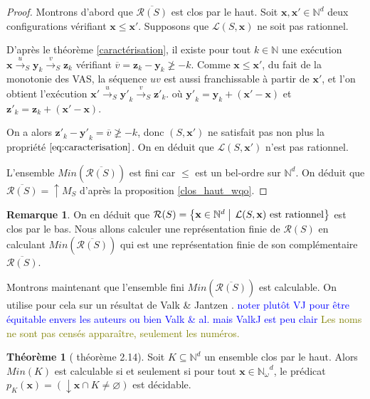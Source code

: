 \documentclass[a4paper,final]{article}
\theoremstyle{definition}
\newtheorem{Theorem}{Théorème}
\newtheorem*{Remark}{Remarque}
\let\leq\leqslant
\let\geq\geqslant
\newcommand{\alain}[1]{\textcolor{blue}{#1}}
\newcommand{\lucas}[1]{\textcolor{olive}{#1}}
\newcommand{\set}[2]{\left\{#1\mathrel{\left|\vphantom{#1}\vphantom{#2}\right.}#2\right\}}
\let\vide\varnothing
\newcommand{\Min}{\textit{Min}}
\newcommand{\N}{\ensuremath{\mathbb{N}}}
\newcommand{\Nomega}{\ensuremath{\mathbb{N}_\omega}}
\newcommand{\lang}{\ensuremath{\mathcal{L}}}
\newcommand{\trans}[2]{\ensuremath{\stackrel{#1}{\longrightarrow}_{#2}}}
\newcommand{\vect}[1]{\ensuremath{\mathbf{#1}}}
\newcommand{\valeur}[1]{\ensuremath{\overline{#1}}}
\newcommand{\inirat}{\mathcal{R}}
\begin{document}
\begin{proof}
Montrons d'abord que $\overline{\inirat(S)}$ est clos par le haut. Soit $\vect{x},\vect{x'}\in\N^d$ deux configurations vérifiant $\vect{x} \leq \vect{x'}$.
Supposons que $\lang(S,\vect{x})$ ne soit pas rationnel.

D'après le théorème \ref{caractérisation}, il existe pour tout $k\in\N$ une exécution $\vect{x} \trans{u}{S} \vect{y}_k \trans{v}{S} \vect{z}_k$ vérifiant $\valeur{v} = \vect{z}_k - \vect{y}_k \not\geq -k$.
Comme $\vect{x}\leq\vect{x'}$, du fait de la monotonie des VAS, la séquence $uv$ est aussi franchissable à partir de $\vect{x'}$, et l'on obtient l'exécution $\vect{x'} \trans{u}{S} \vect{y'}_k \trans{v}{S} \vect{z'}_k$.
où $\vect{y'}_k = \vect{y}_k + (\vect{x'} - \vect{x})$ et $\vect{z'}_k = \vect{z}_k + (\vect{x'} - \vect{x})$.

On a alors $\vect{z'}_k - \vect{y'}_k = \valeur{v} \not\geq -k$, donc $(S,\vect{x'})$ ne satisfait pas non plus la propriété $\eqref{eq:caracterisation}$.
On en déduit que $\lang(S,\vect{x'})$ n'est pas rationnel.

L'ensemble $\Min(\overline{\inirat(S)})$ est fini car $\leq$ est un bel-ordre sur $\N^d$. On déduit que $\overline{\inirat(S)}=\uparrow M_S$ d'après la proposition \ref{clos_haut_wqo}.
\end{proof}

\begin{Remark}
On en déduit que $\inirat(S) = \set{\vect{x} \in \N^d} {\lang(S,\vect{x}) \text{ est rationnel}}$ est clos par le bas. Nous allons calculer une représentation finie de $\inirat(S)$ en calculant $\Min(\overline{\inirat(S)})$ qui est une représentation finie de son complémentaire $\overline{\inirat(S)}$.
\end{Remark}

Montrons maintenant que l'ensemble fini $\Min(\overline{\inirat(S)})$ est calculable.
On utilise pour cela sur un résultat de Valk \& Jantzen \cite{vaja85}.
\alain{noter plutôt VJ pour être équitable envers les auteurs ou bien Valk \& al. mais ValkJ est peu clair}
\lucas{Les noms ne sont pas censés apparaître, seulement les numéros.}

\begin{Theorem}[\cite{vaja85} théorème 2.14]
Soit $K \subseteq \N^d$ un ensemble clos par le haut.
Alors $\Min(K)$ est calculable si et seulement si pour tout $\vect{x} \in \Nomega^d$, le prédicat $p_K(\vect{x}) = (\downarrow \vect{x} \cap K \neq \vide)$ est décidable.
\end{Theorem}
\end{document}
